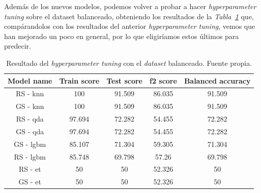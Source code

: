 Además de los nuevos modelos, podemos volver a probar a hacer \textit{hyperparameter tuning} sobre el dataset balanceado, obteniendo los resultados de la \textit{Tabla\ \ref{tab:hyperparameter-tuning-results-v2}} que, compárandolos con los resultados del anterior \textit{hyperparameter tuning}, vemos que han mejorado un poco en general, por lo que eligiríamos estos últimos para predecir. 

\begin{table}[!ht]
    \centering
    \begin{tabular}{|c|cccc|} \hline
        Model name & Train score & Test score & f2 score & Balanced accuracy \\ \hline
        RS - knn & 100 & 91.509 & 86.035 & 91.509 \\
        GS - knn & 100 & 91.509 & 86.035 & 91.509 \\
        RS - qda & 97.694 & 72.282 & 54.455 & 72.282 \\
        GS - qda & 97.694 & 72.282 & 54.455 & 72.282 \\
        GS - lgbm & 85.107 & 71.304 & 59.305 & 71.304 \\
        RS - lgbm & 85.748 & 69.798 & 57.26 & 69.798 \\
        RS - et & 50 & 50 & 52.326 & 50 \\
        GS - et & 50 & 50 & 52.326 & 50 \\ \hline
    \end{tabular}
    \caption{Resultado del \textit{hyperparameter tuning} con el \textit{dataset} balanceado. Fuente propia.}\ \label{tab:hyperparameter-tuning-results-v2}
\end{table}